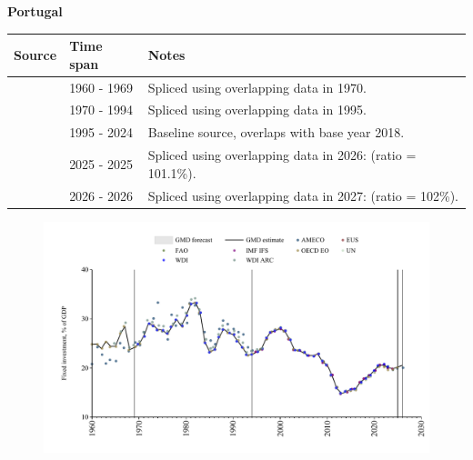 \documentclass[12pt,a4paper,landscape]{article}
\begin{document}
\begin{adjustbox}{max totalsize={\paperwidth}{\paperheight},center}
\begin{minipage}[t][\textheight][t]{\textwidth}
\vspace*{0.5cm}
{}
\begin{center}
{\Large\bfseries Portugal}
\end{center}
\vspace{0.5cm}
\begin{table}[H]
\centering
\small
\begin{tabular}{|l|l|l|}
\hline
\textbf{Source} & \textbf{Time span} & \textbf{Notes} \\
\hline
\rowcolor{white}\cite{OECD_EO}& 1960 - 1969 &Spliced using overlapping data in 1970.\\
\rowcolor{lightgray}\cite{WDI}& 1970 - 1994 &Spliced using overlapping data in 1995.\\
\rowcolor{white}\cite{EUS}& 1995 - 2024 &Baseline source, overlaps with base year 2018.\\
\rowcolor{lightgray}\cite{OECD_EO}& 2025 - 2025 &Spliced using overlapping data in 2026: (ratio = 101.1\%).\\
\rowcolor{white}\cite{AMECO}& 2026 - 2026 &Spliced using overlapping data in 2027: (ratio = 102\%).\\
\hline
\end{tabular}
\end{table}
\begin{figure}[H]
\centering
\includegraphics[width=\textwidth,height=0.6\textheight,keepaspectratio]{graphs/PRT_finv_GDP.pdf}
\end{figure}
\end{minipage}
\end{adjustbox}
\end{document}
